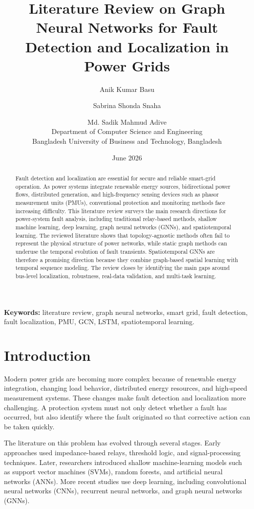 \documentclass[12pt,a4paper]{article}
\title{\textbf{Literature Review on Graph Neural Networks for Fault Detection and Localization in Power Grids}}
\author{
Anik Kumar Basu \and
Sabrina Shonda Snaha \and
Md. Sadik Mahmud Adive\\
Department of Computer Science and Engineering\\
Bangladesh University of Business and Technology, Bangladesh
}
\date{June 2026}
\begin{document}
\maketitle

\begin{abstract}
Fault detection and localization are essential for secure and reliable smart-grid operation. As power systems integrate renewable energy sources, bidirectional power flows, distributed generation, and high-frequency sensing devices such as phasor measurement units (PMUs), conventional protection and monitoring methods face increasing difficulty. This literature review surveys the main research directions for power-system fault analysis, including traditional relay-based methods, shallow machine learning, deep learning, graph neural networks (GNNs), and spatiotemporal learning. The reviewed literature shows that topology-agnostic methods often fail to represent the physical structure of power networks, while static graph methods can underuse the temporal evolution of fault transients. Spatiotemporal GNNs are therefore a promising direction because they combine graph-based spatial learning with temporal sequence modeling. The review closes by identifying the main gaps around bus-level localization, robustness, real-data validation, and multi-task learning.
\end{abstract}

\noindent\textbf{Keywords:} literature review, graph neural networks, smart grid, fault detection, fault localization, PMU, GCN, LSTM, spatiotemporal learning.

\section{Introduction}

Modern power grids are becoming more complex because of renewable energy integration, changing load behavior, distributed energy resources, and high-speed measurement systems. These changes make fault detection and localization more challenging. A protection system must not only detect whether a fault has occurred, but also identify where the fault originated so that corrective action can be taken quickly.

The literature on this problem has evolved through several stages. Early approaches used impedance-based relays, threshold logic, and signal-processing techniques. Later, researchers introduced shallow machine-learning models such as support vector machines (SVMs), random forests, and artificial neural networks (ANNs). More recent studies use deep learning, including convolutional neural networks (CNNs), recurrent neural networks, and graph neural networks (GNNs).
\end{document}
